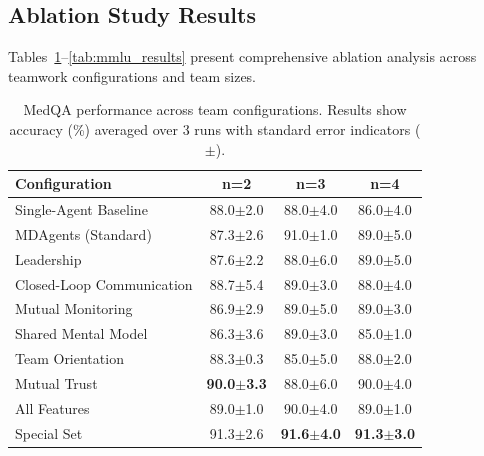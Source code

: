 \documentclass[letterpaper]{article} %
\begin{document}
\subsection{Ablation Study Results}

Tables~\ref{tab:medqa_results}--\ref{tab:mmlu_results} present comprehensive ablation analysis across teamwork configurations and team sizes.

\begin{table}[htbp]
\centering
\caption{MedQA performance across team configurations. Results show accuracy (\%) averaged over 3 runs with standard error indicators ($\pm$).}
\label{tab:medqa_results}
\scriptsize
\begin{tabular}{l|ccc}
\hline
\textbf{Configuration} & \textbf{n=2} & \textbf{n=3} & \textbf{n=4} \\
\hline
Single-Agent Baseline & 88.0$\pm$2.0 & 88.0$\pm$4.0 & 86.0$\pm$4.0 \\
MDAgents (Standard) & 87.3$\pm$2.6 & 91.0$\pm$1.0 & 89.0$\pm$5.0 \\
Leadership & 87.6$\pm$2.2 & 88.0$\pm$6.0 & 89.0$\pm$5.0 \\
Closed-Loop Communication & 88.7$\pm$5.4 & 89.0$\pm$3.0 & 88.0$\pm$4.0 \\
Mutual Monitoring & 86.9$\pm$2.9 & 89.0$\pm$5.0 & 89.0$\pm$3.0 \\
Shared Mental Model & 86.3$\pm$3.6 & 89.0$\pm$3.0 & 85.0$\pm$1.0 \\
Team Orientation & 88.3$\pm$0.3 & 85.0$\pm$5.0 & 88.0$\pm$2.0 \\
Mutual Trust & \textbf{90.0$\pm$3.3} & 88.0$\pm$6.0 & 90.0$\pm$4.0 \\
All Features & 89.0$\pm$1.0 & 90.0$\pm$4.0 & 89.0$\pm$1.0 \\
Special Set & 91.3$\pm$2.6 & \textbf{91.6$\pm$4.0} & \textbf{91.3$\pm$3.0} \\
\hline
\end{tabular}
\end{table}
\end{document}
